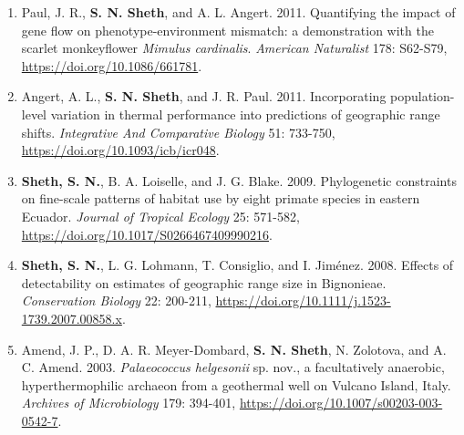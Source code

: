 \documentclass[11pt,english]{article}\usepackage[]{graphicx}\usepackage[]{xcolor}
\providecommand{\tabularnewline}{\\}
\begin{document}
\begin{hangparas}{.5in}{1}
\begin{enumerate}
 \item Paul, J. R., \textbf{S. N. Sheth}, and A. L. Angert. 2011. Quantifying the impact of gene flow on phenotype-environment mismatch: a demonstration with the scarlet monkeyflower \textit{Mimulus cardinalis}. \emph{American Naturalist} 178: S62-S79, \url{https://doi.org/10.1086/661781}. 
 
\item Angert, A. L., \textbf{S. N. Sheth}, and J. R. Paul. 2011. Incorporating population-level variation in thermal performance into predictions of geographic range shifts. \emph{Integrative And Comparative Biology} 51: 733-750, \url{https://doi.org/10.1093/icb/icr048}. 

\item \textbf{Sheth, S. N.}, B. A. Loiselle, and J. G. Blake. 2009. Phylogenetic constraints on fine-scale patterns of habitat use by eight primate species in eastern Ecuador. \emph{Journal of Tropical Ecology} 25: 571-582, \url{https://doi.org/10.1017/S0266467409990216}. 

\item \textbf{Sheth, S. N.}, L. G. Lohmann, T. Consiglio, and I. Jim\'enez. 2008. Effects of detectability on estimates of geographic range size in Bignonieae. \emph{Conservation Biology} 22: 200-211, \url{https://doi.org/10.1111/j.1523-1739.2007.00858.x}. 

\item Amend, J. P., D. A. R. Meyer-Dombard, \textbf{S. N. Sheth}, N. Zolotova, and A. C. Amend. 2003. \textit{Palaeococcus helgesonii} sp. nov., a facultatively anaerobic, hyperthermophilic archaeon from a geothermal well on Vulcano Island, Italy. \emph{Archives of Microbiology} 179: 394-401, \url{https://doi.org/10.1007/s00203-003-0542-7}. 

\end{enumerate}
\end{hangparas}



\end{document}
